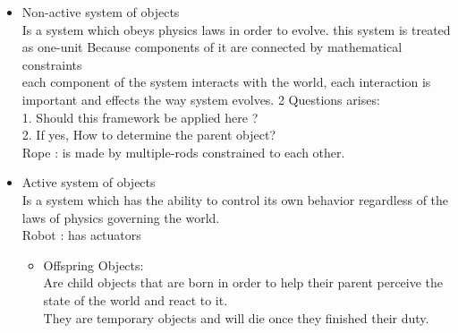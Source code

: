\documentclass[a4paper]{report}
\newcommand{\cm}[1]{{\color{red}#1}}
\newcommand{\eg}[1]{{\color{violet}#1}}
\begin{document}
\begin{itemize}


\item Non-active system of objects \\
Is a system which obeys physics laws in order to evolve.
this system is treated as one-unit Because components of it are connected by mathematical constraints\\
\cm{each component of the system interacts with the world, each interaction is important and effects the way system evolves. 2 Questions arises: \\ 
1. Should this framework be applied here ?\\
2. If yes, How to determine the parent object?
}\\
\eg{Rope : is made by multiple-rods constrained to each other. }

\item Active system of objects\\
Is a system which has the ability to control its own behavior regardless of the laws of physics governing the world.\\
\eg{Robot : has actuators}
	\begin{itemize}
	\item Offspring Objects:\\
Are child objects that are born in order to help their parent perceive the state of the world and react to it.\\
They are temporary objects and will die once they finished their duty.\\

	\end{itemize}


\end{itemize}
\end{document}
